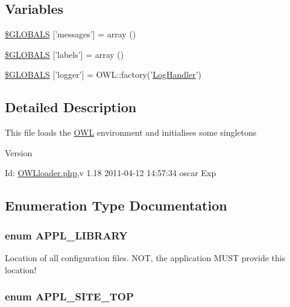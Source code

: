 \subsection*{Variables}
\begin{DoxyCompactItemize}
\item 
\hyperlink{OWLloader_8php_a65f2996116eed36e9ab25f254a470259}{\$GLOBALS} \mbox{[}'messages'\mbox{]} = array ()
\item 
\hyperlink{OWLloader_8php_a49e8feb96fae9cb6655df44ebad3ca2b}{\$GLOBALS} \mbox{[}'labels'\mbox{]} = array ()
\item 
\hyperlink{OWLloader_8php_ad8f7743ae327face727dae55887c2a43}{\$GLOBALS} \mbox{[}'logger'\mbox{]} = OWL::factory('\hyperlink{classLogHandler}{LogHandler}')
\end{DoxyCompactItemize}


\subsection{Detailed Description}
This file loads the \hyperlink{classOWL}{OWL} environment and initialises some singletons \begin{DoxyVersion}{Version}

\end{DoxyVersion}
\begin{DoxyParagraph}{Id:}
\hyperlink{OWLloader_8php}{OWLloader.php},v 1.18 2011-\/04-\/12 14:57:34 oscar Exp 
\end{DoxyParagraph}


\subsection{Enumeration Type Documentation}
\subsubsection[{APPL\_\-LIBRARY}]{\setlength{\rightskip}{0pt plus 5cm}enum {\bf APPL\_\-LIBRARY}}\label{OWLloader_8php_a1b19bb6ffba1d1e7871092e086cc4e94}


Location of all configuration files. NOT, the application MUST provide this location! 

\subsubsection[{APPL\_\-SITE\_\-TOP}]{\setlength{\rightskip}{0pt plus 5cm}enum {\bf APPL\_\-SITE\_\-TOP}}\label{OWLloader_8php_a17a0c6fb6eda7d05081d16bc519c97b5}



